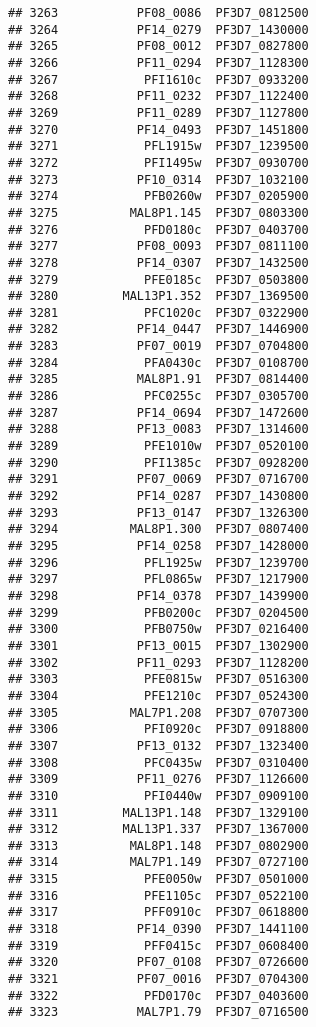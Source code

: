 \documentclass[12pt, a4paper]{article}\usepackage[]{graphicx}\usepackage[]{color}
\makeatletter
\newenvironment{kframe}{%
 \def\at@end@of@kframe{}%
 \ifinner\ifhmode%
  \def\at@end@of@kframe{\end{minipage}}%
  \begin{minipage}{\columnwidth}%
 \fi\fi%
 \def\FrameCommand##1{\hskip\@totalleftmargin \hskip-\fboxsep
 \colorbox{shadecolor}{##1}\hskip-\fboxsep
     \hskip-\linewidth \hskip-\@totalleftmargin \hskip\columnwidth}%
 \MakeFramed {\advance\hsize-\width
   \@totalleftmargin\z@ \linewidth\hsize
   \@setminipage}}%
 {\par\unskip\endMakeFramed%
 \at@end@of@kframe}
\newenvironment{knitrout}{}{} %
\makeatother
\begin{document}
\begin{knitrout}
\begin{kframe}
\begin{verbatim}
## 3263           PF08_0086  PF3D7_0812500
## 3264           PF14_0279  PF3D7_1430000
## 3265           PF08_0012  PF3D7_0827800
## 3266           PF11_0294  PF3D7_1128300
## 3267            PFI1610c  PF3D7_0933200
## 3268           PF11_0232  PF3D7_1122400
## 3269           PF11_0289  PF3D7_1127800
## 3270           PF14_0493  PF3D7_1451800
## 3271            PFL1915w  PF3D7_1239500
## 3272            PFI1495w  PF3D7_0930700
## 3273           PF10_0314  PF3D7_1032100
## 3274            PFB0260w  PF3D7_0205900
## 3275          MAL8P1.145  PF3D7_0803300
## 3276            PFD0180c  PF3D7_0403700
## 3277           PF08_0093  PF3D7_0811100
## 3278           PF14_0307  PF3D7_1432500
## 3279            PFE0185c  PF3D7_0503800
## 3280         MAL13P1.352  PF3D7_1369500
## 3281            PFC1020c  PF3D7_0322900
## 3282           PF14_0447  PF3D7_1446900
## 3283           PF07_0019  PF3D7_0704800
## 3284            PFA0430c  PF3D7_0108700
## 3285           MAL8P1.91  PF3D7_0814400
## 3286            PFC0255c  PF3D7_0305700
## 3287           PF14_0694  PF3D7_1472600
## 3288           PF13_0083  PF3D7_1314600
## 3289            PFE1010w  PF3D7_0520100
## 3290            PFI1385c  PF3D7_0928200
## 3291           PF07_0069  PF3D7_0716700
## 3292           PF14_0287  PF3D7_1430800
## 3293           PF13_0147  PF3D7_1326300
## 3294          MAL8P1.300  PF3D7_0807400
## 3295           PF14_0258  PF3D7_1428000
## 3296            PFL1925w  PF3D7_1239700
## 3297            PFL0865w  PF3D7_1217900
## 3298           PF14_0378  PF3D7_1439900
## 3299            PFB0200c  PF3D7_0204500
## 3300            PFB0750w  PF3D7_0216400
## 3301           PF13_0015  PF3D7_1302900
## 3302           PF11_0293  PF3D7_1128200
## 3303            PFE0815w  PF3D7_0516300
## 3304            PFE1210c  PF3D7_0524300
## 3305          MAL7P1.208  PF3D7_0707300
## 3306            PFI0920c  PF3D7_0918800
## 3307           PF13_0132  PF3D7_1323400
## 3308            PFC0435w  PF3D7_0310400
## 3309           PF11_0276  PF3D7_1126600
## 3310            PFI0440w  PF3D7_0909100
## 3311         MAL13P1.148  PF3D7_1329100
## 3312         MAL13P1.337  PF3D7_1367000
## 3313          MAL8P1.148  PF3D7_0802900
## 3314          MAL7P1.149  PF3D7_0727100
## 3315            PFE0050w  PF3D7_0501000
## 3316            PFE1105c  PF3D7_0522100
## 3317            PFF0910c  PF3D7_0618800
## 3318           PF14_0390  PF3D7_1441100
## 3319            PFF0415c  PF3D7_0608400
## 3320           PF07_0108  PF3D7_0726600
## 3321           PF07_0016  PF3D7_0704300
## 3322            PFD0170c  PF3D7_0403600
## 3323           MAL7P1.79  PF3D7_0716500

\end{verbatim}
\end{kframe}
\end{knitrout}
\end{document}
